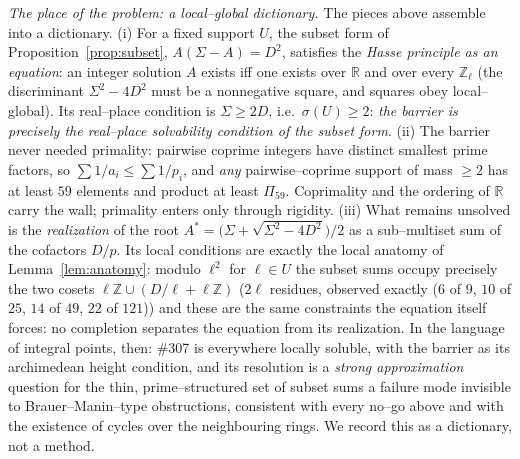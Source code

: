 \documentclass[11pt]{article}
\theoremstyle{definition}
\begin{document}
\emph{The place of the problem: a local--global dictionary.} The pieces above assemble into a dictionary. \textup{(i)} For a fixed support $U$, the subset form of
Proposition~\ref{prop:subset}, $A(\Sigma-A)=D^2$, satisfies the \emph{Hasse principle as an equation}:
an integer solution $A$ exists iff one exists over $\mathbb{R}$ and over every $\mathbb{Z}_\ell$ (the
discriminant $\Sigma^2-4D^2$ must be a nonnegative square, and squares obey local--global). Its
real--place condition is $\Sigma\ge2D$, i.e.\ $\sigma(U)\ge2$: \emph{the barrier is precisely the
real--place solvability condition of the subset form}. \textup{(ii)} The barrier never needed
primality: pairwise coprime integers have distinct smallest prime factors, so
$\sum 1/a_i\le\sum1/p_i$, and \emph{any} pairwise--coprime support of mass $\ge2$ has at least $59$
elements and product at least $\Pi_{59}$. Coprimality and the ordering of $\mathbb{R}$ carry the wall;
primality enters only through rigidity. \textup{(iii)} What remains unsolved is the \emph{realization}
of the root $A^*=\bigl(\Sigma+\sqrt{\Sigma^2-4D^2}\bigr)/2$ as a sub--multiset sum of the cofactors
$D/p$. Its local conditions are exactly the local anatomy of Lemma~\ref{lem:anatomy}: modulo $\ell^2$
for $\ell\in U$ the subset sums occupy precisely the two cosets
$\ell\mathbb{Z}\cup(D/\ell+\ell\mathbb{Z})$ ($2\ell$ residues, observed exactly ($6$ of $9$, $10$ of
$25$, $14$ of $49$, $22$ of $121$)) and these are the same constraints the equation itself forces:
no completion separates the equation from its realization. In the language of integral points, then:
\#307 is everywhere locally soluble, with the barrier as its archimedean height condition, and its
resolution is a \emph{strong approximation} question for the thin, prime--structured set of subset sums
a failure mode invisible to Brauer--Manin--type obstructions, consistent with every no--go above
and with the existence of cycles over the neighbouring rings. We record this as a dictionary, not a
method.
\end{document}
